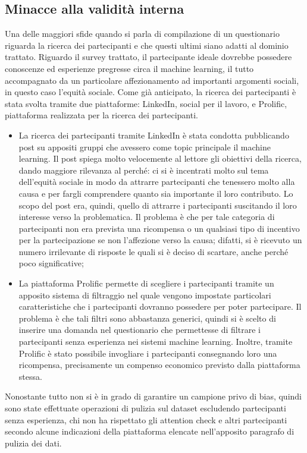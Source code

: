 \subsection{Minacce alla validità interna}
Una delle maggiori sfide quando si parla di compilazione di un questionario riguarda la ricerca dei partecipanti e che questi ultimi siano adatti al dominio trattato. Riguardo il survey trattato, il partecipante ideale dovrebbe possedere conoscenze ed esperienze pregresse circa il machine learning, il tutto accompagnato da un particolare affezionamento ad importanti argomenti sociali, in questo caso l'equità sociale. Come già anticipato, la ricerca dei partecipanti è stata svolta tramite due piattaforme: LinkedIn, social per il lavoro, e Prolific, piattaforma realizzata per la ricerca dei partecipanti.
\begin{itemize}
    \item La ricerca dei partecipanti tramite LinkedIn è stata condotta pubblicando post su appositi gruppi che avessero come topic principale il machine learning. Il post spiega molto velocemente al lettore gli obiettivi della ricerca, dando maggiore rilevanza al perché: ci si è incentrati molto sul tema dell'equità sociale in modo da attrarre partecipanti che tenessero molto alla causa e per fargli comprendere quanto sia importante il loro contributo. Lo scopo del post era, quindi, quello di attrarre i partecipanti suscitando il loro interesse verso la problematica. Il problema è che per tale categoria di partecipanti non era prevista una ricompensa o un qualsiasi tipo di incentivo per la partecipazione se non l'affezione verso la causa; difatti, si è ricevuto un numero irrilevante di risposte le quali si è deciso di scartare, anche perché poco significative;
    \item La piattaforma Prolific permette di scegliere i partecipanti tramite un apposito sistema di filtraggio nel quale vengono impostate particolari caratteristiche che i partecipanti dovranno possedere per poter partecipare. Il problema è che tali filtri sono abbastanza generici, quindi si è scelto di inserire una domanda nel questionario che permettesse di filtrare i partecipanti senza esperienza nei sistemi machine learning. Inoltre, tramite Prolific è stato possibile invogliare i partecipanti consegnando loro una ricompensa, precisamente un compenso economico previsto dalla piattaforma stessa.
\end{itemize}
Nonostante tutto non si è in grado di garantire un campione privo di bias, quindi sono state effettuate operazioni di pulizia sul dataset escludendo partecipanti senza esperienza, chi non ha rispettato gli attention check e altri partecipanti secondo alcune indicazioni della piattaforma elencate nell'apposito paragrafo di pulizia dei dati.\\
